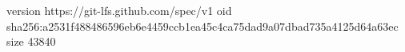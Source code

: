 version https://git-lfs.github.com/spec/v1
oid sha256:a2531f488486596eb6e4459ccb1ea45c4ca75dad9a07dbad735a4125d64a63ec
size 43840
